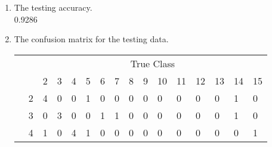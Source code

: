 \documentclass[12pt]{article}
\begin{document}
\begin{enumerate}
\item The testing accuracy.\\
0.9286  
\item The confusion matrix for the testing data.\\
\begin{table}[H]
\begin{tabular}{@{}llclllllllllllll@{}}
\multicolumn{1}{c}{}                                       &                            & \multicolumn{14}{c}{\cellcolor[HTML]{38FFF8}True Class}                                                                                                                                                                                                                                                                                                                                                     \\
\multicolumn{1}{c}{}                                       &                            & \cellcolor[HTML]{38FFF8}2 & \cellcolor[HTML]{38FFF8}3 & \cellcolor[HTML]{38FFF8}4 & \cellcolor[HTML]{38FFF8}5 & \cellcolor[HTML]{38FFF8}6 & \cellcolor[HTML]{38FFF8}7 & \cellcolor[HTML]{38FFF8}8 & \cellcolor[HTML]{38FFF8}9 & \cellcolor[HTML]{38FFF8}10 & \cellcolor[HTML]{38FFF8}11 & \cellcolor[HTML]{38FFF8}12 & \cellcolor[HTML]{38FFF8}13 & \cellcolor[HTML]{38FFF8}14 & \cellcolor[HTML]{38FFF8}15 \\
\cellcolor[HTML]{34FF34}                                   & \cellcolor[HTML]{34FF34}2  & 4                         & 0                         & 0                         & 1                         & 0                         & 0                         & 0                         & 0                         & 0                          & 0                          & 0                          & 0                          & 1                          & 0                          \\
\cellcolor[HTML]{34FF34}                                   & \cellcolor[HTML]{34FF34}3  & 0                         & 3                         & 0                         & 0                         & 1                         & 1                         & 0                         & 0                         & 0                          & 0                          & 0                          & 0                          & 1                          & 0                          \\
\cellcolor[HTML]{34FF34}                                   & \cellcolor[HTML]{34FF34}4  & 1                         & 0                         & 4                         & 1                         & 0                         & 0                         & 0                         & 0                         & 0                          & 0                          & 0                          & 0                          & 0                          & 1                          \\

\end{tabular}
\end{table}
\end{enumerate}
\end{document}

